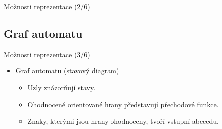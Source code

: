\documentclass[hyperref={unicode}]{beamer}
\begin{document}
\begin{frame}{Možnosti reprezentace (2/6)}
\begin{table}[h]
\begin{center}
    \vspace{1em}
    \caption{Příklad tabulky přechových funkcí}
\end{center}
\end{table}
\end{frame}

\subsection{Graf automatu}
\begin{frame}[t]{Možnosti reprezentace (3/6)}
\begin{itemize}
    \item Graf automatu (stavový diagram) \vspace{1em}
    \begin{itemize}
        \setlength\itemsep{0.7em}
        \item Uzly znázorňují stavy.
        \item Ohodnocené orientované hrany představují přechodové funkce.
        \item Znaky, kterými jsou hrany ohodnoceny, tvoří vstupní abecedu.
    \end{itemize}
\end{itemize}
\end{frame}
\end{document}
